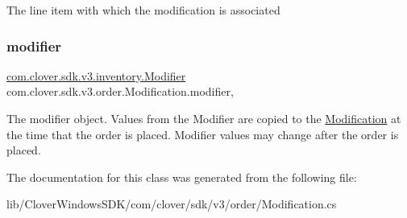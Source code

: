 The line item with which the modification is associated 

\mbox{\label{classcom_1_1clover_1_1sdk_1_1v3_1_1order_1_1_modification_a56419d1dc4c9a9c813a1d5a2bc86e9c8}} 
\subsubsection{\texorpdfstring{modifier}{modifier}}
{\footnotesize\ttfamily \hyperlink{classcom_1_1clover_1_1sdk_1_1v3_1_1inventory_1_1_modifier}{com.\+clover.\+sdk.\+v3.\+inventory.\+Modifier} com.\+clover.\+sdk.\+v3.\+order.\+Modification.\+modifier\hspace{0.3cm}{\ttfamily [get]}, {\ttfamily [set]}}



The modifier object. Values from the Modifier are copied to the \hyperlink{classcom_1_1clover_1_1sdk_1_1v3_1_1order_1_1_modification}{Modification} at the time that the order is placed. Modifier values may change after the order is placed. 



The documentation for this class was generated from the following file\+:\begin{DoxyCompactItemize}
\item 
lib/\+Clover\+Windows\+S\+D\+K/com/clover/sdk/v3/order/Modification.\+cs\end{DoxyCompactItemize}
